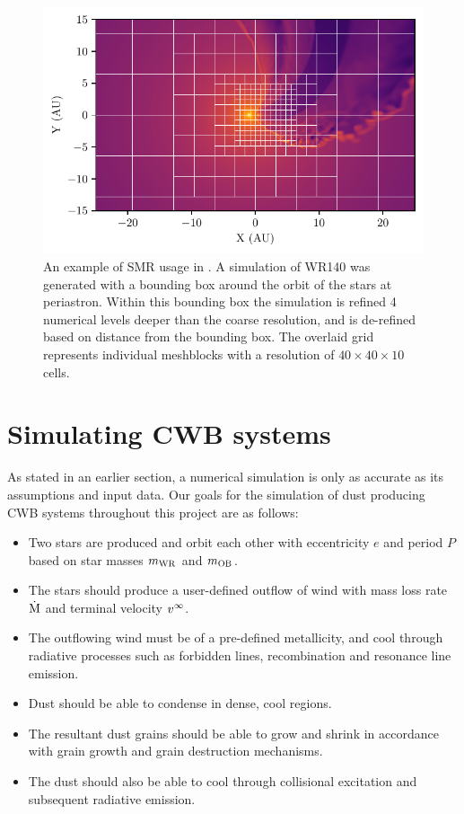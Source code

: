 \begin{figure}[ht]
  \centering
  \includegraphics{assets/refinement/wr140/gridref.pdf}
  \caption[Static mesh refinement in \athena]{An example of SMR usage in \athena. A simulation of WR140 was generated with a bounding box around the orbit of the stars at periastron. Within this bounding box the simulation is refined 4 numerical levels deeper than the coarse resolution, and is de-refined based on distance from the bounding box. The overlaid grid represents individual meshblocks with a resolution of $40\times 40 \times 10$ cells.}
  \label{fig:smr-example}
\end{figure}

\section{Simulating CWB systems}

As stated in an earlier section, a numerical simulation is only as accurate as its assumptions and input data.
Our goals for the simulation of dust producing CWB systems throughout this project are as follows:

\begin{itemize}
  \item Two stars are produced and orbit each other with eccentricity $e$ and period $P$ based on star masses $m_\text{WR}$ and $m_\text{OB}$.
  \item The stars should produce a user-defined outflow of wind with mass loss rate $\dot{\text{M}}$ and terminal velocity $v^\infty$.
  \item The outflowing wind must be of a pre-defined metallicity, and cool through radiative processes such as forbidden lines, recombination and resonance line emission.
  \item Dust should be able to condense in dense, cool regions.
  \item The resultant dust grains should be able to grow and shrink in accordance with grain growth and grain destruction mechanisms.
  \item The dust should also be able to cool through collisional excitation and subsequent radiative emission.
\end{itemize}

